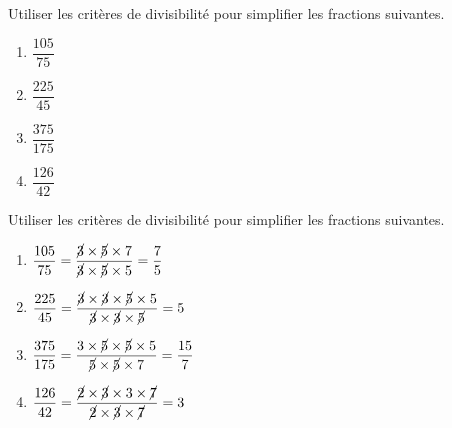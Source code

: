 \begin{exercice*}
    Utiliser les critères de divisibilité pour simplifier les fractions suivantes.
    \begin{enumerate}
        \item $\dfrac{105}{75}$
        \item $\dfrac{225}{45}$
        \item $\dfrac{375}{175}$
        \item $\dfrac{126}{42}$
    \end{enumerate}
    

\end{exercice*}
\begin{corrige}
    Utiliser les critères de divisibilité pour simplifier les fractions suivantes.
    
    \begin{enumerate}
        \item $\dfrac{105}{75}=\dfrac{\cancel{3}\times\cancel{5}\times7}{\cancel{3}\times\cancel{5}\times5}=\dfrac{7}{5}$
        \item $\dfrac{225}{45}=\dfrac{\cancel{3}\times\cancel{3}\times\cancel{5}\times5}{\cancel{3}\times\cancel{3}\times\cancel{5}}=5$
        \item $\dfrac{375}{175}=\dfrac{3\times\cancel{5}\times\cancel{5}\times5}{\cancel{5}\times\cancel{5}\times7}=\dfrac{15}{7}$
        \item $\dfrac{126}{42}=\dfrac{\cancel{2}\times\cancel{3}\times3\times\cancel{7}}{\cancel{2}\times\cancel{3}\times\cancel{7}}=3$
    \end{enumerate}
\end{corrige}


